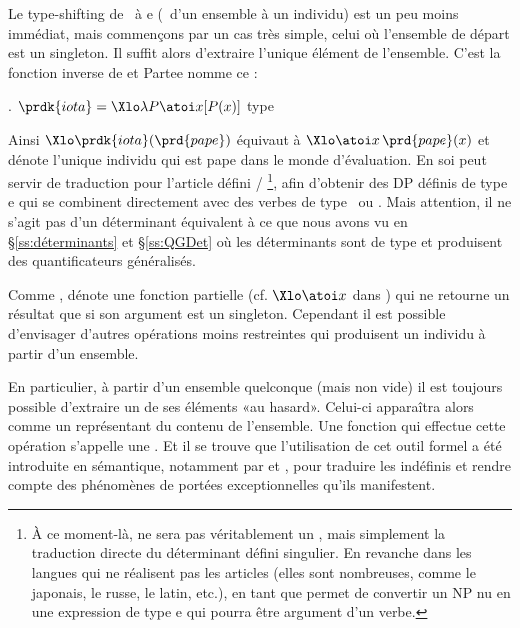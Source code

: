 Le type-shifting de \et\ à \typ e (\ie\ d'un ensemble à un individu) est un peu moins immédiat, mais commençons par un cas très simple, celui où l'ensemble de départ est un singleton. Il suffit alors d'extraire l'unique élément de l'ensemble. C'est la fonction inverse de  et Partee nomme  ce  :

\ex.
\(\prdk{iota} = \Xlo\lambda P\atoi x[P(x)]\)
\hfill type 


Ainsi $\Xlo\prdk{iota}(\prd{pape})$ équivaut à $\Xlo\atoi x\,\prd{pape}(x)$ et dénote l'unique individu qui est pape dans le monde d'évaluation.
En soi  peut servir de traduction pour l'article défini /%
\footnote{À ce moment-là,  ne sera pas véritablement un , mais simplement la traduction directe du déterminant défini singulier. En revanche dans les langues qui ne réalisent pas les articles (elles sont nombreuses, comme le japonais, le russe, le latin, etc.),  en tant que  permet de convertir un NP nu en une expression de type \typ e qui pourra être argument d'un verbe. }, afin d'obtenir des DP définis de type \typ e qui se combinent directement avec des verbes de type \et\ ou \eet.
Mais attention, il ne s'agit pas d'un déterminant équivalent à ce que nous avons vu en \S\ref{ss:déterminants} et \S\ref{ss:QGDet} où les déterminants sont de type \type{\et,\ett} et produisent des quantificateurs généralisés. 

Comme ,  dénote une fonction partielle (cf. $\Xlo\atoi x$ dans \Last) qui ne retourne un résultat que si son argument est un singleton. 
Cependant il est possible d'envisager d'autres opérations moins restreintes qui produisent un individu à partir d'un ensemble.

En particulier,  à partir d'un ensemble quelconque (mais non vide) il est toujours possible d'extraire un de ses éléments «au hasard».  Celui-ci apparaîtra alors comme un représentant du contenu de l'ensemble.  
Une fonction qui effectue cette opération s'appelle une .
Et il se trouve que l'utilisation de cet outil formel a été introduite %
en sémantique, notamment par  \citet{Reinhart:97} et \citet{Winter:97}, pour traduire les indéfinis et rendre compte des phénomènes de portées exceptionnelles qu'ils manifestent.

